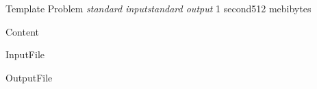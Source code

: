 \begin{problem}{Template Problem}
{\textsl{standard input}}{\textsl{standard output}}
{1 second}{512 mebibytes}{}

Content

\InputFile

InputFile

\OutputFile

OutputFile

\Examples

\begin{example}
%
%
\end{example}

\end{problem}
